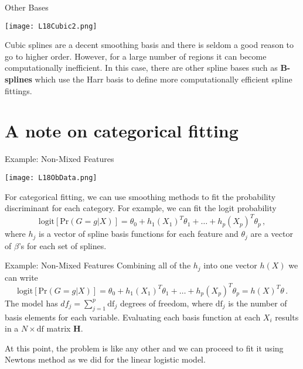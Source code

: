 \documentclass[10pt, table, dvipsnames,xcdraw,handout]{beamer}
\begin{document}
\begin{frame}[fragile]{Other Bases}
  \begin{minipage}[t][0.5\textheight][t]{\textwidth}
	\centering \texttt{[image: L18Cubic2.png]} 
  \end{minipage}
  \vfill
\begin{minipage}[t][0.5\textheight][t]{\textwidth}
Cubic splines are a decent smoothing basis and there is seldom a good reason to go to higher order. However, for a large number of regions it can become computationally inefficient. In this case, there are other spline bases such as \textbf{B-splines} which use the Harr basis to define more computationally efficient spline fittings.
\end{minipage}
\end{frame}


\section{A note on categorical fitting}



\begin{frame}[fragile]{Example: Non-Mixed Features}
  \begin{minipage}[t][0.5\textheight][t]{\textwidth}
	\centering \texttt{[image: L18ObData.png]} 
  \end{minipage}
  \vfill
\begin{minipage}[t][0.5\textheight][t]{\textwidth}
For categorical fitting, we can use smoothing methods to fit the probability discriminant for each category. For example, we can fit the logit probability
$$
\text{logit}[\text{Pr}(G=g|X)] = \theta_0 + h_1(X_1)^T\theta_1+\ldots+h_p(X_p)^T\theta_p\,,
$$\pause
where $h_j$ is a vector of spline basis functions for each feature and $\theta_j$ are a vector of $\beta$'s for each set of splines.  
\end{minipage}
\end{frame}




\begin{frame}[fragile]{Example: Non-Mixed Features}
Combining all of the $h_j$ into one vector $h(X)$ we can write
$$
\text{logit}[\text{Pr}(G=g|X)] = \theta_0 + h_1(X_1)^T\theta_1+\ldots+h_p(X_p)^T\theta_p = h(X)^T\theta\,.
$$\pause
The model has $df_{j} = \sum_{j=1}^p \text{df}_j$ degrees of freedom, where $\text{df}_j$ is the number of basis elements for each variable. Evaluating each basis function at each $X_i$ results in a $N\times \text{df}$ matrix $\mathbf{H}$.\pause

At this point, the problem is like any other and we can proceed to fit it using Newtons method as we did for the linear logistic model. 
\end{frame}
\end{document}
